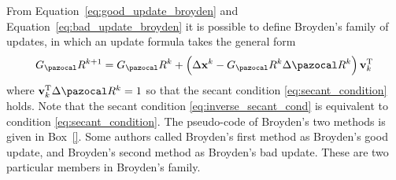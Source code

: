 From Equation~\eqref{eq:good_update_broyden} and Equation~\eqref{eq:bad_update_broyden} it is possible to define Broyden's family of updates, in which an update formula takes the general form
\begin{equation}
G_\pazocal R^{k+1}=G_\pazocal R^{k}+\left(\Delta \mathbf x^{k}-G_\pazocal R^{k} \Delta \pazocal R^{k}\right) \mathbf v_{k}^{\mathrm{T}}
\end{equation}
where \(\mathbf v_{k}^{\mathrm{T}} \Delta \pazocal R^{k}=1\) so that the secant condition \eqref{eq:secant_condition} holds.
Note that the secant condition \eqref{eq:inverse_secant_cond} is equivalent to condition \eqref{eq:secant_condition}.
The pseudo-code of Broyden's two methods is given in Box~\ref{}.
Some authors called Broyden's first method as Broyden's good update, and Broyden's second method as Broyden's bad update.
These are two particular members in Broyden's family.


